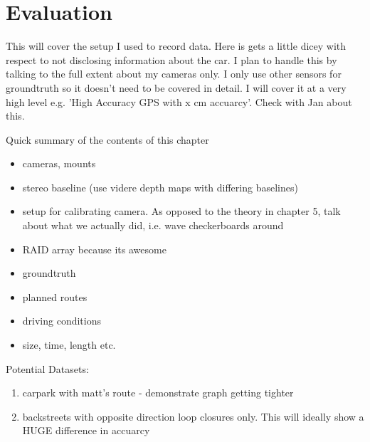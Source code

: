 \chapter{Evaluation}
\label{chapter:evaluation}

This will cover the setup I used to record data.  Here is gets a little dicey with respect to not
disclosing information about the car.  I plan to handle this by talking to the full extent about my
cameras only.  I only use other sensors for groundtruth so it doesn't need to be covered in
detail.  I will cover it at a very high level e.g. 'High Accuracy GPS with x cm accuarcy'.  Check
with Jan about this.

Quick summary of the contents of this chapter

\begin{itemize}
 \item cameras, mounts
 \item stereo baseline (use videre depth maps with differing baselines)
\item setup for calibrating camera.  As opposed to the theory in chapter 5, talk about what we
actually did, i.e. wave checkerboards around
\item RAID array because its awesome
\item groundtruth 
\item planned routes
\item driving conditions
\item size, time, length etc.
\end{itemize}

Potential Datasets:
\begin{enumerate}
\item carpark with matt's route - demonstrate graph getting tighter
\item backstreets with opposite direction loop closures only.  This will ideally show a HUGE
difference in accuarcy
\end{enumerate}
 

